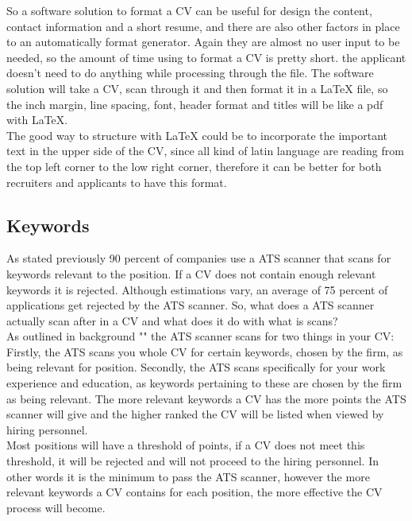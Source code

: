 So a software solution to format a CV can be useful for design the content, contact information and a short resume,
and there are also other factors in place to an automatically format generator. Again they are almost no user input to be needed, 
so the amount of time using to format a CV is pretty short. 
the applicant doesn't need to do anything while processing through the file. The software solution will take a CV, scan through it and
then format it in a LaTeX file, so the inch margin, line spacing, font, header format and titles 
will be like a pdf with LaTeX.\\

The good way to structure with LaTeX could be to incorporate the important text in the upper side of the CV, 
since all kind of latin language are reading from the top left corner to the low right corner, therefore it can be better
for both recruiters and applicants to have this format\cite{Pdf_vs_word}.\\

\subsection{Keywords}
As stated previously 90 percent of companies use a ATS scanner that scans for keywords relevant to the position.
If a CV does not contain enough relevant keywords it is rejected. 
Although estimations vary, an average of 75 percent of applications get rejected by the ATS scanner.
So, what does a ATS scanner actually scan after in a CV and what does it do with what is scans? \\

As outlined in background "" the ATS scanner scans for two things in your CV:
Firstly, the ATS scans you whole CV for certain keywords, chosen by the firm, as being relevant for position.
Secondly, the ATS scans specifically for your work experience and education, 
as keywords pertaining to these are chosen by the firm as being relevant. 
The more relevant keywords a CV has the more points the ATS scanner will give 
and the higher ranked the CV will be listed when viewed by hiring personnel. \\

Most positions will have a threshold of points, if a CV does not meet this threshold, 
it will be rejected and will not proceed to the hiring personnel.
In other words it is the minimum to pass the ATS scanner, however the more relevant keywords a CV contains for each position, 
the more effective the CV process will become. \\

